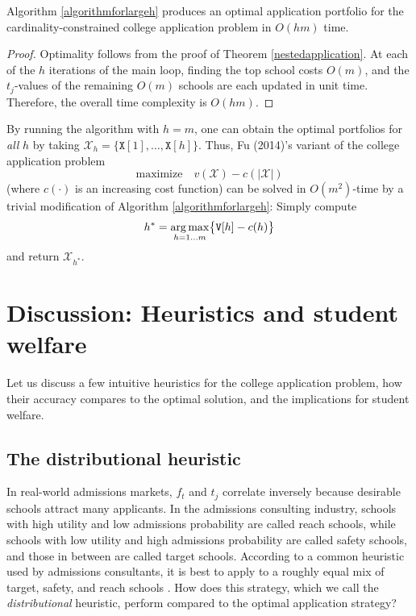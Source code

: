 \begin{theorem} \label{validityofalmaalgorithm}
Algorithm \ref{algorithmforlargeh} produces an optimal application portfolio for the cardinality-constrained college application problem in $O(h m)$ time.
\end{theorem}

\begin{proof}
Optimality follows from the proof of Theorem \ref{nestedapplication}. At each of the $h$ iterations of the main loop, finding the top school costs $O(m)$, and the $t_j$-values of the remaining $O(m)$ schools are each updated in unit time. Therefore, the overall time complexity is $O(h m)$.
\end{proof}

By running the algorithm with $h = m$, one can obtain the optimal portfolios for \emph{all} $h$ by taking $\mathcal{X}_h = \{ \mathtt{X}[1], \dots, \mathtt{X}[h]\}$. Thus, Fu (2014)'s variant of the college application problem 
\[ \text{maximize} \quad v(\mathcal{X}) - c(|\mathcal{X}|)\]
(where $c(\cdot)$ is an increasing cost function) can be solved in $O(m^2)$-time by a trivial modification of Algorithm \ref{algorithmforlargeh}: Simply compute
\[h^* = \operatorname*{arg\,max}_{h = 1 \dots m} \bigl\{\mathtt{V}[h] - c(h)\bigr\}\] and return $\mathcal{X}_{h^*}$.  






\section{Discussion: Heuristics and student welfare} \label{sectionDiscussion}

Let us discuss a few intuitive heuristics for the college application problem, how their
accuracy compares to the optimal solution, and the implications for student welfare.

\subsection{The distributional heuristic}

In real-world admissions markets, $f_t$ and $t_j$ correlate inversely because desirable schools attract many applicants. In the admissions consulting industry, schools with high utility and low admissions probability are called reach schools, while schools with low utility and high admissions probability are called safety schools, and those in between are called target schools. According to a common heuristic used by admissions consultants, it is best to apply to a roughly equal mix of target, safety, and reach schools \cite{jeon2015,peck2021}. How does this strategy, which we call the \emph{distributional} heuristic, perform compared to the optimal application strategy?

